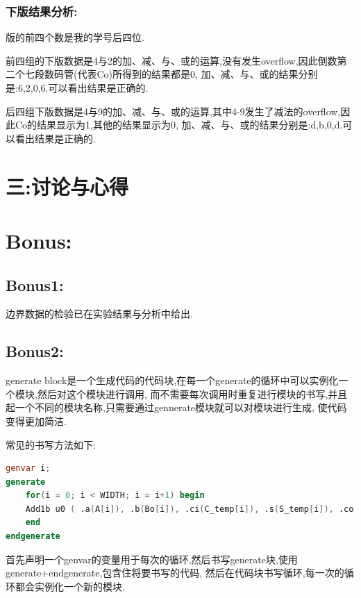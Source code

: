\documentclass{article}
\begin{document}
\subsubsection*{下版结果分析:}
版的前四个数是我的学号后四位.

前四组的下版数据是4与2的加、减、与、或的运算,没有发生overflow,因此倒数第二个七段数码管(代表Co)所得到的结果都是0,
加、减、与、或的结果分别是:6,2,0,6.可以看出结果是正确的.

后四组下版数据是4与9的加、减、与、或的运算,其中4-9发生了减法的overflow,因此Co的结果显示为1,其他的结果显示为0,
加、减、与、或的结果分别是:d,b,0,d.可以看出结果是正确的.


\section*{三:讨论与心得}


\section*{Bonus:}

\subsection*{Bonus1:}
边界数据的检验已在实验结果与分析中给出.

\subsection*{Bonus2:}
generate block是一个生成代码的代码块,在每一个generate的循环中可以实例化一个模块,然后对这个模块进行调用,
而不需要每次调用时重复进行模块的书写,并且起一个不同的模块名称,只需要通过gennerate模块就可以对模块进行生成,
使代码变得更加简洁.

常见的书写方法如下:
\begin{lstlisting}[language=verilog]
genvar i;
generate 
    for(i = 0; i < WIDTH; i = i+1) begin
    Add1b u0 ( .a(A[i]), .b(Bo[i]), .ci(C_temp[i]), .s(S_temp[i]), .co(C_temp[i+1]) );
    end
endgenerate    
\end{lstlisting}

首先声明一个genvar的变量用于每次的循环,然后书写generate块,使用generate+endgenerate,包含住将要书写的代码,
然后在代码块书写循环,每一次的循环都会实例化一个新的模块.
\end{document}

